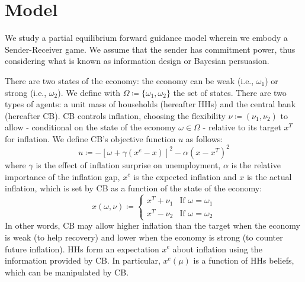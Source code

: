 \documentclass[12pt,a4paper]{article}
\begin{document}
\section{Model} \label{sec:model}

We study a partial equilibrium forward guidance model wherein we embody a Sender-Receiver game. We assume that the sender has commitment power, thus considering what is known as information design or Bayesian persuasion. 

There are two states of the economy: the economy can be weak (i.e., $\omega_1$) or strong (i.e., $\omega_2$). We define with $\Omega \coloneqq \{\omega_1, \omega_2\}$ the set of states.
There are two types of agents: a unit mass of households (hereafter HHs) and the central bank (hereafter CB). CB controls inflation, choosing the flexibility $\nu\coloneqq(\nu_1,\nu_2)$ to allow - conditional on the state of the economy $\omega\in \Omega$ - relative to its target $x^T$ for inflation. We define CB's objective function $u$ as follows:%
\begin{equation}
    \label{uc}
    u \coloneqq -\left[\omega+\gamma(x^e-x)\right]^2-\alpha(x-x^T)^2
\end{equation}
where $\gamma$ is the effect of inflation surprise on unemployment, $\alpha$ is the relative importance of the inflation gap, $x^e$ is the expected inflation and $x$ is the actual inflation, which is set by CB as a function of the state of the economy: 
\begin{equation}
    x(\omega,\nu)\coloneqq\left\{
    \begin{array}{cc}
      x^T+\nu_1&  \mbox{If } \omega=\omega_1\\
      x^T-\nu_2   &  \mbox{If } \omega=\omega_2
    \end{array}
    \right.
\end{equation}
In other words, CB may allow higher inflation than the target when the economy is weak (to help recovery) and lower when the economy is strong (to counter future inflation).
HHs form an expectation $x^e$ about inflation using the information provided by CB. In particular, $x^e(\mu)$ is a function of HHs beliefs, which can be manipulated by CB.
\end{document}
